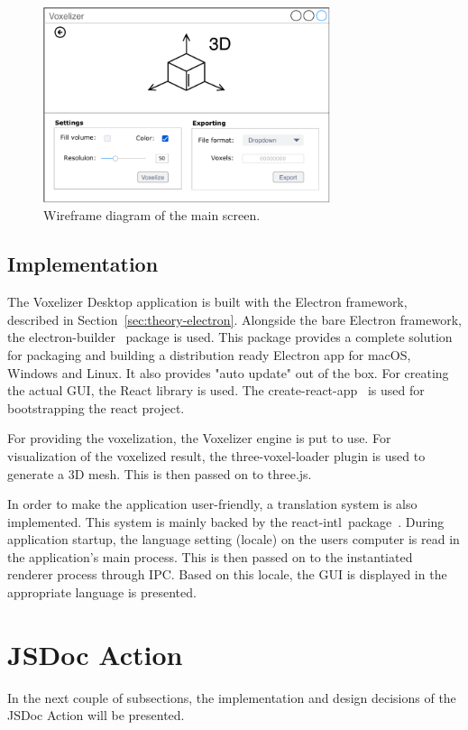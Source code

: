 \begin{figure}[htp]
    \centering
    \includegraphics[width=0.75\textwidth]{sections/methodology/figures/wireframes/wireframe-main-screen.pdf}
    \caption{Wireframe diagram of the main screen.}
    \label{fig:wireframe-main-screen}
\end{figure}

\subsection{Implementation}
The Voxelizer Desktop application is built with the Electron framework, described in Section~\ref{sec:theory-electron}. Alongside the bare Electron framework, the electron-builder~\cite{electron-builder} package is used. This package provides a complete solution for packaging and building a distribution ready Electron app for macOS, Windows and Linux. It also provides "auto update" out of the box. For creating the actual GUI, the React library is used. The create-react-app~\cite{create-react-app} is used for bootstrapping the react project.

For providing the voxelization, the Voxelizer engine is put to use. For visualization of the voxelized result, the three-voxel-loader plugin is used to generate a 3D mesh. This is then passed on to three.js.

In order to make the application user-friendly, a translation system is also implemented. This system is mainly backed by the react-intl~package~\cite{react-intl}. During application startup, the language setting (locale) on the users computer is read in the application's main process. This is then passed on to the instantiated renderer process through IPC. Based on this locale, the GUI is displayed in the appropriate language is presented.

\section{JSDoc Action}
In the next couple of subsections, the implementation and design decisions of the JSDoc Action will be presented.
